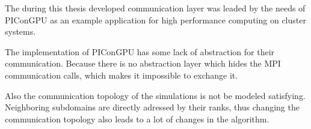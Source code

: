 The during this thesis developed communication layer was leaded by the
needs of PIConGPU as an example application for high performance
computing on cluster systems.

The implementation of PIConGPU has some lack of abstraction for their
communication. Because there is no abstraction layer which hides the
MPI communication calls, which makes it impossible to exchange it.

Also the communication topology of the simulations is not be modeled
satisfying. Neighboring subdomains are directly adressed by their
ranks, thus changing the communication topology also leads to a lot of
changes in the algorithm.



\cleardoublepage

